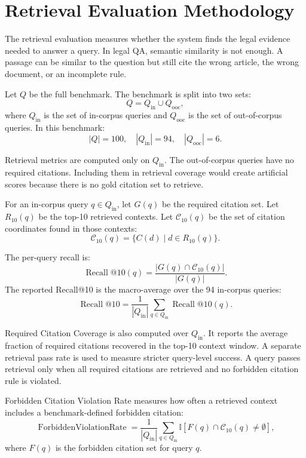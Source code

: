 \section{Retrieval Evaluation Methodology}
\label{sec:retrieval-performance-analysis-methodology}

The retrieval evaluation measures whether the system finds the legal evidence needed to answer a query. In legal QA, semantic similarity is not enough. A passage can be similar to the question but still cite the wrong article, the wrong document, or an incomplete rule.

Let $Q$ be the full benchmark. The benchmark is split into two sets:
\[
Q = Q_{\mathrm{in}} \cup Q_{\mathrm{ooc}},
\]
where $Q_{\mathrm{in}}$ is the set of in-corpus queries and $Q_{\mathrm{ooc}}$ is the set of out-of-corpus queries. In this benchmark:
\[
|Q| = 100,\quad |Q_{\mathrm{in}}| = 94,\quad |Q_{\mathrm{ooc}}| = 6.
\]

Retrieval metrics are computed only on $Q_{\mathrm{in}}$. The out-of-corpus queries have no required citations. Including them in retrieval coverage would create artificial scores because there is no gold citation set to retrieve.

For an in-corpus query $q \in Q_{\mathrm{in}}$, let $G(q)$ be the required citation set. Let $R_{10}(q)$ be the top-10 retrieved contexts. Let $\mathcal{C}_{10}(q)$ be the set of citation coordinates found in those contexts:
\[
\mathcal{C}_{10}(q) = \{ C(d) \mid d \in R_{10}(q) \}.
\]

The per-query recall is:
\[
\operatorname{Recall}@10(q) =
\frac{|G(q) \cap \mathcal{C}_{10}(q)|}{|G(q)|}.
\]
The reported Recall@10 is the macro-average over the 94 in-corpus queries:
\[
\operatorname{Recall}@10 =
\frac{1}{|Q_{\mathrm{in}}|}
\sum_{q \in Q_{\mathrm{in}}}
\operatorname{Recall}@10(q).
\]

Required Citation Coverage is also computed over $Q_{\mathrm{in}}$. It reports the average fraction of required citations recovered in the top-10 context window. A separate retrieval pass rate is used to measure stricter query-level success. A query passes retrieval only when all required citations are retrieved and no forbidden citation rule is violated.

Forbidden Citation Violation Rate measures how often a retrieved context includes a benchmark-defined forbidden citation:
\[
\operatorname{ForbiddenViolationRate} =
\frac{1}{|Q_{\mathrm{in}}|}
\sum_{q \in Q_{\mathrm{in}}}
\mathbb{I}\left[F(q) \cap \mathcal{C}_{10}(q) \neq \emptyset\right],
\]
where $F(q)$ is the forbidden citation set for query $q$.

